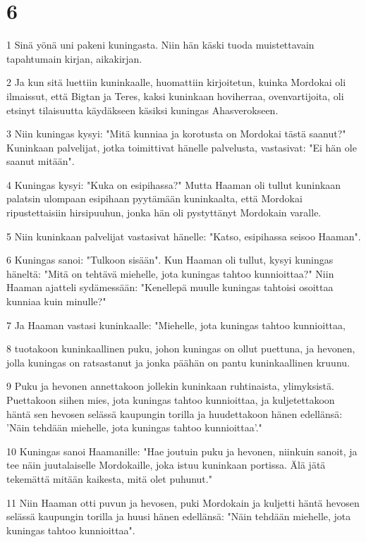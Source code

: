 \chapter{6}

\par 1 Sinä yönä uni pakeni kuningasta. Niin hän käski tuoda muistettavain tapahtumain kirjan, aikakirjan.
\par 2 Ja kun sitä luettiin kuninkaalle, huomattiin kirjoitetun, kuinka Mordokai oli ilmaissut, että Bigtan ja Teres, kaksi kuninkaan hoviherraa, ovenvartijoita, oli etsinyt tilaisuutta käydäkseen käsiksi kuningas Ahasverokseen.
\par 3 Niin kuningas kysyi: "Mitä kunniaa ja korotusta on Mordokai tästä saanut?" Kuninkaan palvelijat, jotka toimittivat hänelle palvelusta, vastasivat: "Ei hän ole saanut mitään".
\par 4 Kuningas kysyi: "Kuka on esipihassa?" Mutta Haaman oli tullut kuninkaan palatsin ulompaan esipihaan pyytämään kuninkaalta, että Mordokai ripustettaisiin hirsipuuhun, jonka hän oli pystyttänyt Mordokain varalle.
\par 5 Niin kuninkaan palvelijat vastasivat hänelle: "Katso, esipihassa seisoo Haaman".
\par 6 Kuningas sanoi: "Tulkoon sisään". Kun Haaman oli tullut, kysyi kuningas häneltä: "Mitä on tehtävä miehelle, jota kuningas tahtoo kunnioittaa?" Niin Haaman ajatteli sydämessään: "Kenellepä muulle kuningas tahtoisi osoittaa kunniaa kuin minulle?"
\par 7 Ja Haaman vastasi kuninkaalle: "Miehelle, jota kuningas tahtoo kunnioittaa,
\par 8 tuotakoon kuninkaallinen puku, johon kuningas on ollut puettuna, ja hevonen, jolla kuningas on ratsastanut ja jonka päähän on pantu kuninkaallinen kruunu.
\par 9 Puku ja hevonen annettakoon jollekin kuninkaan ruhtinaista, ylimyksistä. Puettakoon siihen mies, jota kuningas tahtoo kunnioittaa, ja kuljetettakoon häntä sen hevosen selässä kaupungin torilla ja huudettakoon hänen edellänsä: 'Näin tehdään miehelle, jota kuningas tahtoo kunnioittaa'."
\par 10 Kuningas sanoi Haamanille: "Hae joutuin puku ja hevonen, niinkuin sanoit, ja tee näin juutalaiselle Mordokaille, joka istuu kuninkaan portissa. Älä jätä tekemättä mitään kaikesta, mitä olet puhunut."
\par 11 Niin Haaman otti puvun ja hevosen, puki Mordokain ja kuljetti häntä hevosen selässä kaupungin torilla ja huusi hänen edellänsä: "Näin tehdään miehelle, jota kuningas tahtoo kunnioittaa".
